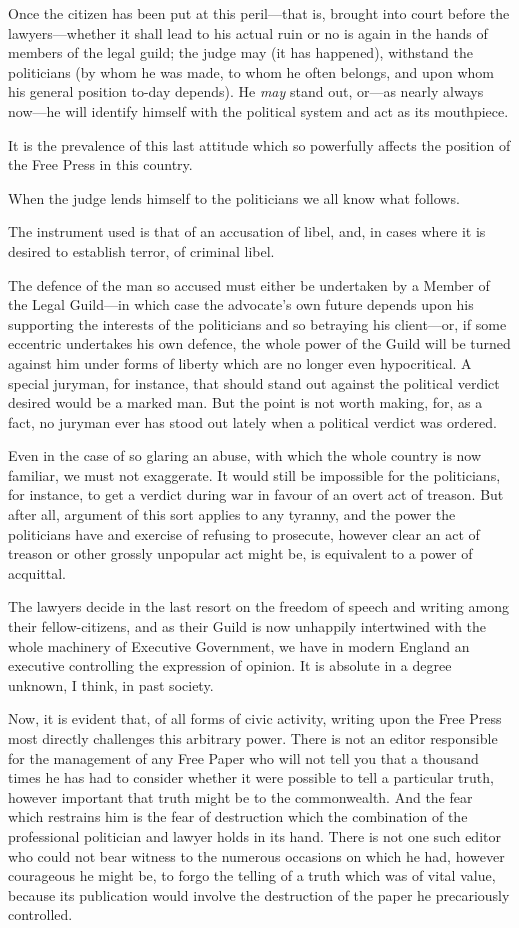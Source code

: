 \documentclass{book}
\begin{document}
Once the citizen has been put at this peril—that is, brought into court before the lawyers—whether it shall lead to his actual ruin or no is again in the hands of members of the legal guild; the judge may (it has happened), withstand the politicians (by whom he was made, to whom he often belongs, and upon whom his general position to-day depends). He \emph{may} stand out, or—as nearly always now—he will identify himself with the political system and act as its mouthpiece.

It is the prevalence of this last attitude which so powerfully affects the position of the Free Press in this country.

When the judge lends himself to the politicians we all know what follows.

The instrument used is that of an accusation of libel, and, in cases where it is desired to establish terror, of criminal libel.

The defence of the man so accused must either be undertaken by a Member of the Legal Guild—in which case the advocate’s own future depends upon his supporting the interests of the politicians and so betraying his client—or, if some eccentric undertakes his own defence, the whole power of the Guild will be turned against him under forms of liberty which are no longer even hypocritical. A special juryman, for instance, that should stand out against the political verdict desired would be a marked man. But the point is not worth making, for, as a fact, no juryman ever has stood out lately when a political verdict was ordered.

Even in the case of so glaring an abuse, with which the whole country is now familiar, we must not exaggerate. It would still be impossible for the politicians, for instance, to get a verdict during war in favour of an overt act of treason. But after all, argument of this sort applies to any tyranny, and the power the politicians have and exercise of refusing to prosecute, however clear an act of treason or other grossly unpopular act might be, is equivalent to a power of acquittal.

The lawyers decide in the last resort on the freedom of speech and writing among their fellow-citizens, and as their Guild is now unhappily intertwined with the whole machinery of Executive Government, we have in modern England an executive controlling the expression of opinion. It is absolute in a degree unknown, I think, in past society.

Now, it is evident that, of all forms of civic activity, writing upon the Free Press most directly challenges this arbitrary power. There is not an editor responsible for the management of any Free Paper who will not tell you that a thousand times he has had to consider whether it were possible to tell a particular truth, however important that truth might be to the commonwealth. And the fear which restrains him is the fear of destruction which the combination of the professional politician and lawyer holds in its hand. There is not one such editor who could not bear witness to the numerous occasions on which he had, however courageous he might be, to forgo the telling of a truth which was of vital value, because its publication would involve the destruction of the paper he precariously controlled.
\end{document}
